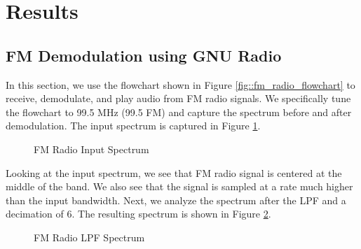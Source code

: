 \documentclass{article}
\begin{document}
\section{Results}

\subsection{FM Demodulation using GNU Radio}

In this section, we use the flowchart shown in Figure \ref{fig::fm_radio_flowchart} to receive, demodulate, and play audio from FM radio signals. We specifically tune the flowchart to 99.5 MHz (99.5 FM) and capture the spectrum before and after demodulation. The input spectrum is captured in Figure \ref{fig::fm_radio_input_spectrum}.

\begin{figure}[H]
	\centerline{}
	\caption{FM Radio Input Spectrum}
	\label{fig::fm_radio_input_spectrum}
\end{figure}

\noindent Looking at the input spectrum, we see that FM radio signal is centered at the middle of the band. We also see that the signal is sampled at a rate much higher than the input bandwidth. Next, we analyze the spectrum after the LPF and a decimation of 6. The resulting spectrum is shown in Figure \ref{fig::fm_radio_lpf_spectrum}.

\begin{figure}[H]
	\centerline{}
	\caption{FM Radio LPF Spectrum}
	\label{fig::fm_radio_lpf_spectrum}
\end{figure}
\end{document}
